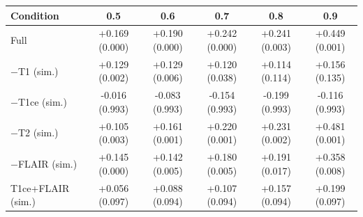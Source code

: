 \begin{tabular}{lccccc}
\toprule
Condition & 0.5 & 0.6 & 0.7 & 0.8 & 0.9 \\
\midrule
Full & +0.169 (0.000) & +0.190 (0.000) & +0.242 (0.000) & +0.241 (0.003) & +0.449 (0.001) \\
$-$T1 (sim.) & +0.129 (0.002) & +0.129 (0.006) & +0.120 (0.038) & +0.114 (0.114) & +0.156 (0.135) \\
$-$T1ce (sim.) & -0.016 (0.993) & -0.083 (0.993) & -0.154 (0.993) & -0.199 (0.993) & -0.116 (0.993) \\
$-$T2 (sim.) & +0.105 (0.003) & +0.161 (0.001) & +0.220 (0.001) & +0.231 (0.002) & +0.481 (0.001) \\
$-$FLAIR (sim.) & +0.145 (0.000) & +0.142 (0.005) & +0.180 (0.005) & +0.191 (0.017) & +0.358 (0.008) \\
T1ce+FLAIR (sim.) & +0.056 (0.097) & +0.088 (0.094) & +0.107 (0.094) & +0.157 (0.094) & +0.199 (0.097) \\
\bottomrule
\end{tabular}
